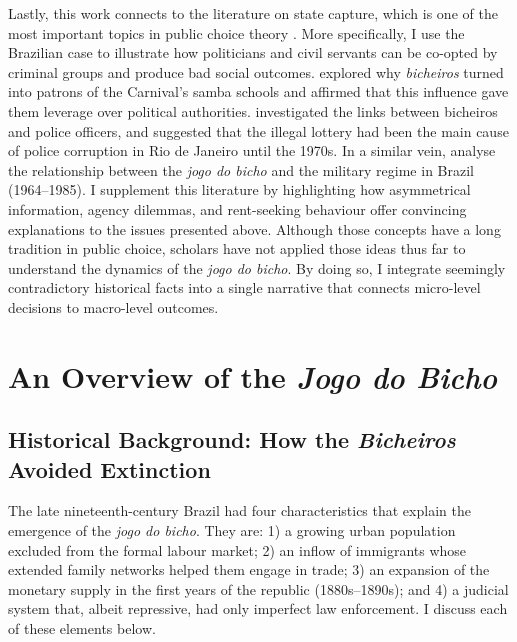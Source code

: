 \documentclass[a4paper,12pt]{article}
\begin{document}
Lastly, this work connects to the literature on state capture, which is one of the most important topics in public choice theory \citep{rose1978corruption,shleifer2002grabbing,tollison1982rent}. More specifically, I use the Brazilian case to illustrate how politicians and civil servants can be co-opted by criminal groups and produce bad social outcomes. \citet{queiroz1992carnaval} explored why \textit{bicheiros} turned into patrons of the Carnival's samba schools and affirmed that this influence gave them leverage over political authorities. \citet{misse2007illegal} investigated the links between bicheiros and police officers, and suggested that the illegal lottery had been the main cause of police corruption in Rio de Janeiro until the 1970s. In a similar vein, \citet{jupiara2015poroes} analyse the relationship between the \textit{jogo do bicho} and the military regime in Brazil (1964--1985). I supplement this literature by highlighting how asymmetrical information, agency dilemmas, and rent-seeking behaviour offer convincing explanations to the issues presented above. Although those concepts have a long tradition in public choice, scholars have not applied those ideas thus far to understand the dynamics of the \textit{jogo do bicho}. By doing so, I integrate seemingly contradictory historical facts into a single narrative that connects micro-level decisions to macro-level outcomes. 

\section{An Overview of the \textit{Jogo do Bicho}}
\label{sec:overview}

\subsection{Historical Background: How the \textit{Bicheiros} Avoided Extinction}
\label{sub:historical_background}

The late nineteenth-century Brazil had four characteristics that explain the emergence of the \textit{jogo do bicho}. They are: 1) a growing urban population excluded from the formal labour market; 2) an inflow of immigrants whose extended family networks helped them engage in trade; 3) an expansion of the monetary supply in the first years of the republic (1880s--1890s); and 4) a judicial system that, albeit repressive, had only imperfect law enforcement. I discuss each of these elements below.
\end{document}
